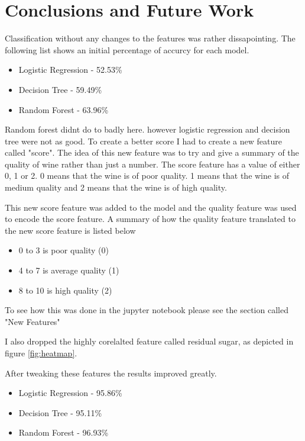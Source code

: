 \section{Conclusions and Future Work}

Classification without any changes to the features was rather dissapointing. The following list shows an initial percentage of accurcy for each model.

\begin{itemize}
  \item Logistic Regression - 52.53\%
  \item Decision Tree - 59.49\%
  \item Random Forest - 63.96\%
\end{itemize}

Random forest didnt do to badly here. however logistic regression and decision tree were not as good. To create a better score I had to create a new feature called "score". The idea of this new feature was to try and give a summary of the quality of wine rather than just a number. The score feature has a value of either 0, 1 or 2. 0 means that the wine is of poor quality. 1 means that the wine is of medium quality and 2 means that the wine is of high quality. 

This new score feature was added to the model and the quality feature was used to encode the score feature. A summary of how the quality feature translated to the new score feature is listed below

\begin{itemize}
  \item 0 to 3 is poor quality (0)
  \item 4 to 7 is average quality (1)
  \item 8 to 10 is high quality (2)
\end{itemize}

To see how this was done in the jupyter notebook please see the section called "New Features"

I also dropped the highly corelalted feature called residual sugar, as depicted in figure \ref{fig:heatmap}. 

After tweaking these features the results improved greatly.

\begin{itemize}
  \item Logistic Regression - 95.86\%
  \item Decision Tree - 95.11\%
  \item Random Forest - 96.93\%
\end{itemize}

